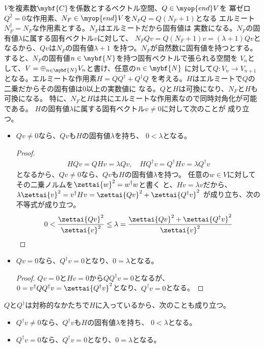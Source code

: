 	$V$を複素数$\mybf{C}$を係数とするベクトル空間、$Q\in\myop{end}V$を
	冪ゼロ$Q^2=0$な作用素、$N_F\in\myop{end}V$を$N_FQ=Q(N_F+1)$となる
	エルミート$N_F^\dag=N_F$な作用素とする。$N_F$はエルミートだから固有値は
	実数になる。$N_F$の固有値$\lambda$に属する固有ベクトル$v$に対して、
	$N_FQv=Q(N_F+1)v=(\lambda+1)Qv$となるから、$Qv$は$N_F$の固有値$\lambda+1$
	を持つ。$N_F$が自然数に固有値を持つとする。
	すると、$N_F$の固有値$n\in\mybf{N}$を持つ固有ベクトルで張られる空間を
	$V_n$として、$V=\oplus_{n\in\mybf{N}}V_n$と書け、任意の$n\in\mybf{N}$
	に対して$Q:V_n\to V_{n+1}$となる。エルミートな作用素$H=QQ^\dag+Q^\dag Q$
	を考える。$H$はエルミートで$Q$の二乗だからその固有値は$0$以上の実数値に
	なる。$Q$と$H$は可換になり、$N_F$と$H$も可換になる。
	特に、$N_F$と$H$は共にエルミートな作用素なので同時対角化が可能である。
	$H$の固有値$\lambda$に属する固有ベクトル$v\neq0$に対して次のことが
	成り立つ。
	\begin{itemize}\setlength{\itemsep}{-1mm} %
		\item $Qv\neq0$なら、$Qv$も$H$の固有値$\lambda$を持ち、
		$0<\lambda$となる。
		\begin{proof} %
			\begin{equation*}\begin{split} %
				HQv=QHv=\lambda Qv,\quad HQ^\dag v=Q^\dag Hv=\lambda Q^\dag v
			\end{split}\end{equation*} %
			となるから、$Qv\neq0$なら、$Qv$も$H$の固有値$\lambda$を持つ。
			任意の$w\in V$に対してその二乗ノルムを$\zettai{w}^2=w^\dag w$と書く
			と、$Hv=\lambda v$だから、
			$\lambda\zettai{v}^2=v^\dag Hv=\zettai{Qv}^2+\zettai{Q^\dag v}^2$
			が成り立ち、次の不等式が成り立つ。
			\begin{equation*}\begin{split} %
				0 < \frac{\zettai{Qv}^2}{\zettai{v}^2} \le \lambda
					= \frac{\zettai{Qv}^2+\zettai{Q^\dag v}^2}{\zettai{v}^2}
			\end{split}\end{equation*} %
		\end{proof} %
		\item $Qv=0$なら、$Q^\dag v=0$となり、$0=\lambda$となる。
		\begin{proof} %
			$Qv=0$と$Hv=0$から$QQ^\dag v=0$となるが、
			$0=v^\dag QQ^\dag v=\zettai{Q^\dag v}^2$となり、$Q^\dag v=0$となる。
		\end{proof} %
	\end{itemize} %
	$Q$と$Q^\dag$は対称的なかたちで$H$に入っているから、次のことも成り立つ。
	\begin{itemize}\setlength{\itemsep}{-1mm} %
		\item $Q^\dag v\neq0$なら、$Q^\dag v$も$H$の固有値$\lambda$を持ち、
		$0<\lambda$となる。
		\item $Q^\dag v=0$なら、$Q^\dag v=0$となり、$0=\lambda$となる。
	\end{itemize} %
